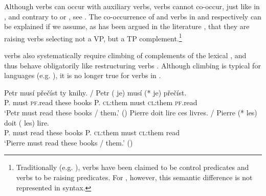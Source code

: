\documentclass[output=paper,colorlinks,citecolor=brown,]{langsci/langscibook}
\begin{document}
\noindent Although  verbs can occur with auxiliary verbs,  verbs cannot co-occur, just like in , and contrary to  or , see . The co-occurrence of  and   verbs in  and  respectively can be explained if we assume, as has been argued in the literature \citep{Ruwet1972,Wurmbrand1999,Wurmbrand2001}, that they are raising verbs selecting not a VP, but a TP complement.\footnote{Traditionally (e.g. \citealt{Ross1969a}),  verbs have been claimed to be control predicates and  verbs to be raising predicates. For \cite{Wurmbrand1999}, however, this semantic difference is not represented in syntax.}

\ea\label{15}
\z\z

\noindent {}  verbs also systematically require climbing of   complements of the lexical , and thus behave obligatorily like restructuring verbs \citep{Medová2000}. Although  climbing is typical for  languages (e.g. \citealt{Rizzi1978,Roberts1991}), it is no longer true for  verbs in .

\begin{exe}
\ex \label{16}
\begin{xlist}
\ex\label{16a}
\gll Petr musí přečíst  ty  knihy.  / Petr (\hspace{-2pt} je) musí (*\hspace{-2pt} je)   přečíst. \\
P.    must \textsc{pf}.read these books   {} P.  {} \textsc{cl}:them must {} \textsc{cl}:them \textsc{pf}.read\\
\glt   `Petr must read these books / them.' \hfill ()
\ex \label{16b}
\gll  Pierre doit  lire   ces livres.  /  Pierre (*\hspace{-2pt} les)  doit  (\hspace{-2pt} les)  lire.\\
P.  must read these books  {} P.   {} \textsc{cl}:them must {} \textsc{cl}:them read\\
\glt `Pierre must read these books / them.' \hfill ()
\end{xlist}
\end{exe}
\end{document}

